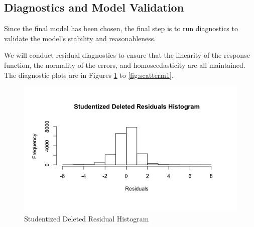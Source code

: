 \documentclass{article}
\begin{document}
    \subsection{Diagnostics and Model Validation}
      Since the final model has been chosen, the final step is to run
      diagnostics to validate the model's stability and reasonableness.

      We will conduct residual diagnostics to ensure that the linearity of
      the response function, the normality of the errors, and homoscedasticity
      are all maintained. The diagnostic plots are in Figures \ref{fig:histm1}
      to \ref{fig:scatterm1}.

      \begin{figure}[H]
        \centering
        \begin{minipage}{.45\textwidth}
          \centering
          \includegraphics[scale=0.35]{selection/histm1}
          \caption{Studentized Deleted Residual Histogram}
          \label{fig:histm1}


\end{minipage}
\end{figure}
\end{document}
